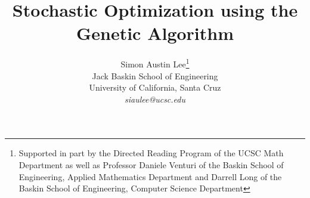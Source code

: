 \title{Stochastic Optimization using the Genetic Algorithm}

\author{ 
Simon Austin Lee\thanks{Supported in part 
by the Directed Reading Program of the UCSC Math Department as well as Professor Daniele Venturi of the Baskin School of Engineering, Applied Mathematics Department and Darrell Long of the Baskin School of Engineering, Computer Science Department}\\
Jack Baskin School of Engineering \\
University of California, Santa Cruz\\
\emph{siaulee@ucsc.edu}
}\date{}
\maketitle 
